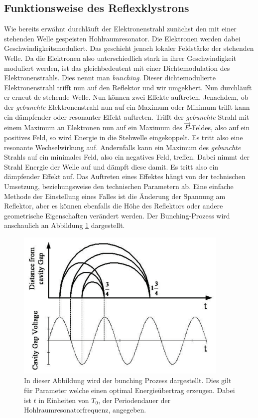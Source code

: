 \subsection{Funktionsweise des Reflexklystrons}
\label{subsec:funktion}
Wie bereits erwähnt durchläuft der Elektronenstrahl zunächst den mit einer stehenden Welle gespeisten Hohlraumresonator. Die Elektronen werden dabei Geschwindigkeitsmoduliert.
Das geschieht jenach lokaler Feldstärke der stehenden Welle. Da die Elektronen also unterschiedlich stark in ihrer Geschwindigkeit moduliert werden, ist das gleichbedeutent mit einer
Dichtemodulation des Elektronenstrahls. Dies nennt man \textit{bunching}. Dieser dichtemodulierte Elektronenstrahl trifft nun auf den Reflektor und wir umgekhert. Nun durchläuft er 
erneut de stehende Welle. Nun können zwei Effekte auftreten. Jenachdem, ob der \textit{gebunchte} Elektronenstrahl nun auf ein Maximum oder Minimum trifft kann ein dämpfender oder 
resonanter Effekt auftreten. Trifft der \textit{gebunchte} Strahl mit einem Maximum an Elektronen nun auf ein Maximum des $\vec{E}$-Feldes, also auf ein positives Feld, so wird 
Energie in die Stehwelle eingekoppelt. Es tritt also eine resonante Wechselwirkung auf. Andernfalls kann ein Maximum des \textit{gebunchte} Strahls auf ein minimales Feld, also 
ein negatives Feld, treffen. Dabei nimmt der Strahl Energie der Welle auf und dämpft diese damit. Es tritt also ein dämpfender Effekt auf. Das Auftreten eines Effektes hängt von der 
technischen Umsetzung, beziehungsweise den technischen Parametern ab. Eine einfache Methode der Einstellung eines Falles ist die Änderung der Spannung am Reflektor, aber es können 
ebenfalls die Höhe des Reflektors oder andere geometrische Eigenschaften verändert werden. Der Bunching-Prozess wird anschaulich an Abbildung \ref{fig:bunching} dargestellt.

\begin{figure}
              \centering
              \includegraphics{content/bunching.PNG}
              \caption{In dieser Abbildung wird der bunching Prozess dargestellt. Dies gilt für Parameter welche einen optimal Energieübertrag erzeugen. Dabei ist $t$ in Einheiten von 
              $T_0$, der Periodendauer der Hohlraumresonatorfrequenz, angegeben.}
              \label{fig:bunching}
\end{figure}

